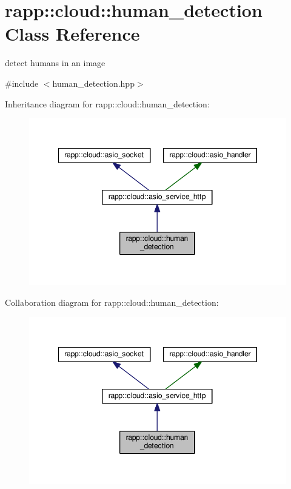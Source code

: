 \hypertarget{classrapp_1_1cloud_1_1human__detection}{\section{rapp\-:\-:cloud\-:\-:human\-\_\-detection Class Reference}
\label{classrapp_1_1cloud_1_1human__detection}
}


detect humans in an image  




{\ttfamily \#include $<$human\-\_\-detection.\-hpp$>$}



Inheritance diagram for rapp\-:\-:cloud\-:\-:human\-\_\-detection\-:
\nopagebreak
\begin{figure}[H]
\begin{center}
\leavevmode
\includegraphics[width=345pt]{classrapp_1_1cloud_1_1human__detection__inherit__graph}
\end{center}
\end{figure}


Collaboration diagram for rapp\-:\-:cloud\-:\-:human\-\_\-detection\-:
\nopagebreak
\begin{figure}[H]
\begin{center}
\leavevmode
\includegraphics[width=345pt]{classrapp_1_1cloud_1_1human__detection__coll__graph}
\end{center}
\end{figure}

